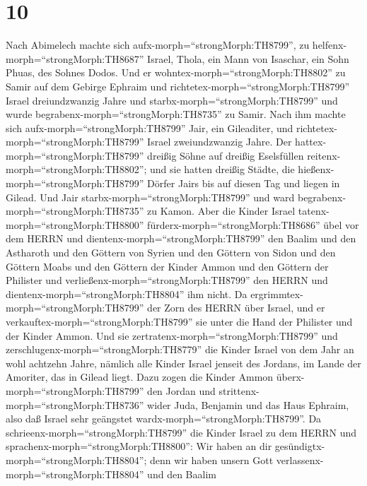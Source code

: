 \hypertarget{section-9}{%
\section{10}\label{section-9}}

 Nach Abimelech machte sich
aufx-morph=``strongMorph:TH8799'', zu
helfenx-morph=``strongMorph:TH8687'' Israel, Thola, ein Mann von
Isaschar, ein Sohn Phuas, des Sohnes Dodos. Und er
wohntex-morph=``strongMorph:TH8802'' zu Samir auf dem Gebirge Ephraim
 und richtetex-morph=``strongMorph:TH8799'' Israel
dreiundzwanzig Jahre und starbx-morph=``strongMorph:TH8799'' und wurde
begrabenx-morph=``strongMorph:TH8735'' zu Samir.  Nach ihm
machte sich aufx-morph=``strongMorph:TH8799'' Jair, ein Gileaditer, und
richtetex-morph=``strongMorph:TH8799'' Israel zweiundzwanzig Jahre.
 Der hattex-morph=``strongMorph:TH8799'' dreißig Söhne auf
dreißig Eselsfüllen reitenx-morph=``strongMorph:TH8802''; und sie hatten
dreißig Städte, die hießenx-morph=``strongMorph:TH8799'' Dörfer Jairs
bis auf diesen Tag und liegen in Gilead.  Und Jair
starbx-morph=``strongMorph:TH8799'' und ward
begrabenx-morph=``strongMorph:TH8735'' zu Kamon.  Aber die
Kinder Israel tatenx-morph=``strongMorph:TH8800''
fürderx-morph=``strongMorph:TH8686'' übel vor dem HERRN und
dientenx-morph=``strongMorph:TH8799'' den Baalim und den Astharoth und
den Göttern von Syrien und den Göttern von Sidon und den Göttern Moabs
und den Göttern der Kinder Ammon und den Göttern der Philister und
verließenx-morph=``strongMorph:TH8799'' den HERRN und
dientenx-morph=``strongMorph:TH8804'' ihm nicht.  Da
ergrimmtex-morph=``strongMorph:TH8799'' der Zorn des HERRN über Israel,
und er verkauftex-morph=``strongMorph:TH8799'' sie unter die Hand der
Philister und der Kinder Ammon.  Und sie
zertratenx-morph=``strongMorph:TH8799'' und
zerschlugenx-morph=``strongMorph:TH8779'' die Kinder Israel von dem Jahr
an wohl achtzehn Jahre, nämlich alle Kinder Israel jenseit des Jordans,
im Lande der Amoriter, das in Gilead liegt.  Dazu zogen die
Kinder Ammon überx-morph=``strongMorph:TH8799'' den Jordan und
strittenx-morph=``strongMorph:TH8736'' wider Juda, Benjamin und das Haus
Ephraim, also daß Israel sehr geängstet
wardx-morph=``strongMorph:TH8799''.  Da
schrieenx-morph=``strongMorph:TH8799'' die Kinder Israel zu dem HERRN
und sprachenx-morph=``strongMorph:TH8800'': Wir haben an dir
gesündigtx-morph=``strongMorph:TH8804''; denn wir haben unsern Gott
verlassenx-morph=``strongMorph:TH8804'' und den Baalim
